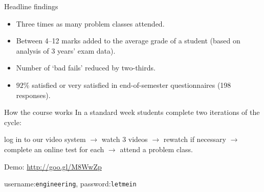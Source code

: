 \documentclass[12pt,envcountsect]{beamer}
\theoremstyle{plain}
\theoremstyle{definition}
\begin{document}
\begin{frame}{Headline findings}\pause
\begin{itemize}
\item Three times as many problem classes attended.\pause
\item Between 4--12 marks added to the average grade of a student (based on analysis of 3 years' exam data).\pause
\item Number of `bad fails' reduced by two-thirds.\pause
\item $92\%$ satisfied or very satisfied in end-of-semester questionnaires (198 responses).
\end{itemize}
\end{frame}


\begin{frame}{How the course works}\pause
In a standard week students complete two iterations of the cycle:\pause

log in to our video system \pause $\rightarrow$ watch 3 videos \pause $\rightarrow$ rewatch if necessary \pause $\rightarrow$ complete an online test for each \pause $\rightarrow$ attend a problem class.\pause

Demo: \url{http://goo.gl/M8WwZp}

username:\texttt{engineering}, password:\texttt{letmein}
\end{frame}

%
%
\end{document}
